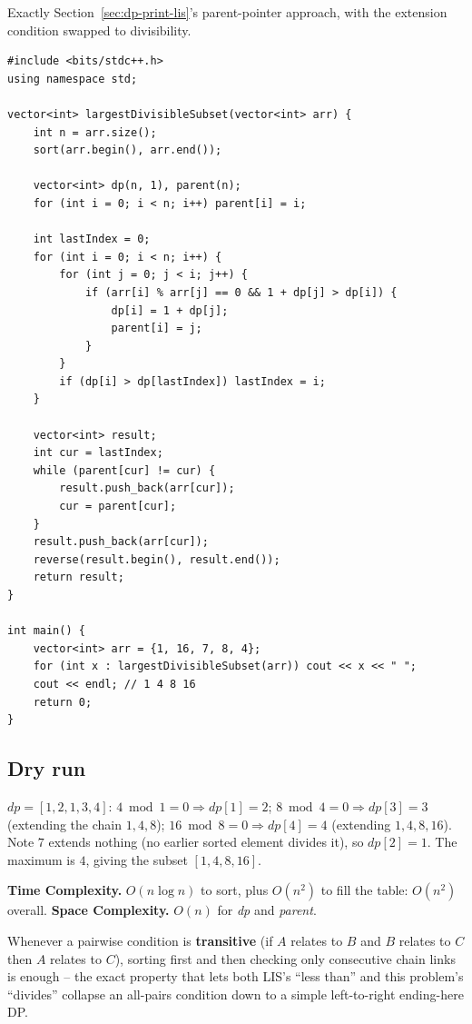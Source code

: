 Exactly Section~\ref{sec:dp-print-lis}'s parent-pointer approach,
with the extension condition swapped to divisibility.

\begin{lstlisting}
#include <bits/stdc++.h>
using namespace std;

vector<int> largestDivisibleSubset(vector<int> arr) {
    int n = arr.size();
    sort(arr.begin(), arr.end());

    vector<int> dp(n, 1), parent(n);
    for (int i = 0; i < n; i++) parent[i] = i;

    int lastIndex = 0;
    for (int i = 0; i < n; i++) {
        for (int j = 0; j < i; j++) {
            if (arr[i] % arr[j] == 0 && 1 + dp[j] > dp[i]) {
                dp[i] = 1 + dp[j];
                parent[i] = j;
            }
        }
        if (dp[i] > dp[lastIndex]) lastIndex = i;
    }

    vector<int> result;
    int cur = lastIndex;
    while (parent[cur] != cur) {
        result.push_back(arr[cur]);
        cur = parent[cur];
    }
    result.push_back(arr[cur]);
    reverse(result.begin(), result.end());
    return result;
}

int main() {
    vector<int> arr = {1, 16, 7, 8, 4};
    for (int x : largestDivisibleSubset(arr)) cout << x << " ";
    cout << endl; // 1 4 8 16
    return 0;
}
\end{lstlisting}

\subsection*{Dry run}


$\textit{dp}=[1,2,1,3,4]$: $4 \bmod 1=0 \Rightarrow \textit{dp}[1]=2$;
$8 \bmod 4=0 \Rightarrow \textit{dp}[3]=3$ (extending the chain
$1,4,8$); $16 \bmod 8=0 \Rightarrow \textit{dp}[4]=4$ (extending
$1,4,8,16$). Note $7$ extends nothing (no earlier sorted element
divides it), so $\textit{dp}[2]=1$. The maximum is $4$, giving the
subset $[1,4,8,16]$.

\begin{complexitybox}
\textbf{Time Complexity.} $O(n \log n)$ to sort, plus $O(n^2)$ to fill
the table: $O(n^2)$ overall.
\textbf{Space Complexity.} $O(n)$ for \textit{dp} and \textit{parent}.
\end{complexitybox}

\begin{takeawaybox}
Whenever a pairwise condition is \textbf{transitive} (if $A$ relates to
$B$ and $B$ relates to $C$ then $A$ relates to $C$), sorting first and
then checking only consecutive chain links is enough -- the exact
property that lets both LIS's ``less than'' and this problem's
``divides'' collapse an all-pairs condition down to a simple
left-to-right ending-here DP.
\end{takeawaybox}
